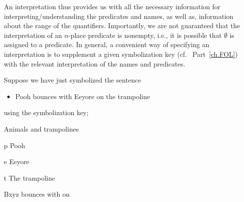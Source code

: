 %	
%	
	
An interpretation thus provides us with all the necessary information for interpreting/understanding the predicates and names, as well as, information about the range of the quantifiers. Importantly, we are not guaranteed that the interpretation of an $n$-place predicate is nonempty, i.e., it is possible that $\emptyset$ is assigned to a predicate. In general, a convenient way of specifying an interpretation is to supplement a given symbolization key (cf.~ Part~\ref{ch.FOL}) with the relevant interpretation of the names and predicates.

Suppose we have just symbolized the sentence
\begin{itemize}
\item Pooh bounces with Eeyore on the trampoline
\end{itemize}
using the symbolization key;
\begin{ekey}
\item[\text{domain}]Animals and trampolines
\item[p]Pooh
\item[e]Eeyore
\item[t]The trampoline
\item[Bxyz] bounces with  on 
\end{ekey}


